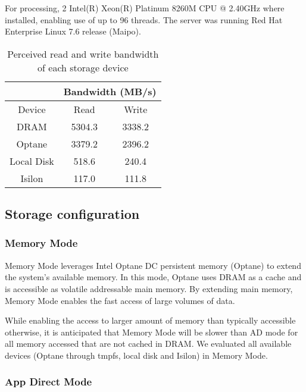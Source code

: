 \documentclass[conference]{IEEEtran}
\begin{document}
For processing,
2 Intel(R) Xeon(R) Platinum 8260M CPU @ 2.40GHz where installed, enabling use of up to 96 threads.
The server was running Red Hat Enterprise Linux 7.6 release (Maipo). 


\begin{table}
\begin{center}
 \begin{tabular}{ |c|c|c| } 
     \cline{2-3}
     \multicolumn{1}{c|}{} & \multicolumn{2}{c|}{Bandwidth (MB/s)} \\\hline
  Device & Read & Write \\
 \hline
 DRAM & 5304.3 & 3338.2 \\  
 Optane & 3379.2 & 2396.2 \\   
 Local Disk & 518.6 & 240.4 \\
 Isilon & 117.0 & 111.8 \\
 \hline
\end{tabular}\caption{Perceived read and write bandwidth of each storage device}\label{table:bandwidths}
\end{center}
\end{table}



\subsection{Storage configuration}

\subsubsection{Memory Mode}

Memory Mode leverages Intel Optane DC persistent memory (Optane) to extend the system's available
memory. In this mode, Optane uses DRAM as a cache and is accessible as
volatile addressable main memory. By extending main memory, Memory Mode enables the
fast access of large volumes of data.

While enabling the access to larger amount of memory than typically accessible otherwise,
it is anticipated that Memory Mode will be slower than AD mode for all memory accessed that
are not cached in DRAM. We evaluated all available devices (Optane through tmpfs, local disk and Isilon)
in Memory Mode.

\subsubsection{App Direct Mode}
\end{document}
